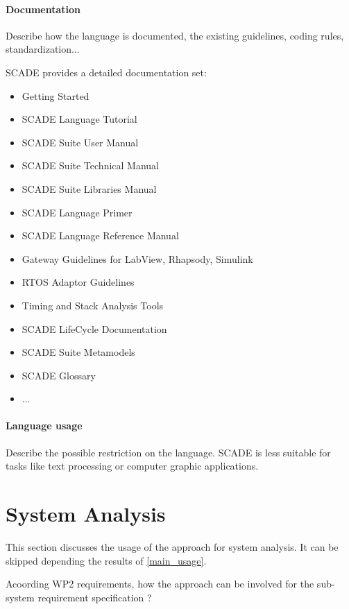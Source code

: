 \paragraph{Documentation} Describe how the language is documented, the existing guidelines, coding rules, standardization...

SCADE provides a detailed documentation set:

\begin{itemize}
	\item Getting Started
	\item SCADE Language Tutorial
	\item SCADE Suite User Manual
	\item SCADE Suite Technical Manual
	\item SCADE Suite Libraries Manual
	\item SCADE Language Primer
	\item SCADE Language Reference Manual
	\item Gateway Guidelines for LabView, Rhapsody, Simulink
	\item RTOS Adaptor Guidelines
	\item Timing and Stack Analysis Tools
	\item SCADE LifeCycle Documentation
	\item SCADE Suite Metamodels
	\item SCADE Glossary
	\item ...
\end{itemize}


\paragraph{Language usage} Describe the possible restriction on the language. 
SCADE is less suitable for tasks like text processing or computer graphic applications.


\section{System Analysis}
This section discusses the usage of the approach for system analysis.
It can be skipped depending the results of \ref{main_usage}.

Acoording WP2 requirements, how the approach can be involved for the sub-system requirement specification ?

